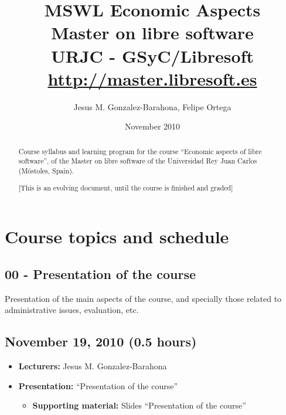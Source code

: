 \documentclass[a4paper]{article}
\title{MSWL Economic Aspects \\
Master on libre software \\
URJC - GSyC/Libresoft \\
\url{http://master.libresoft.es}}
\author{Jesus M. Gonzalez-Barahona, Felipe Ortega}
\date{November 2010}
\begin{document}
\maketitle

\begin{abstract}
Course syllabus and learning program for the course ``Economic aspects of libre software'', of the Master on libre software of the Universidad Rey Juan Carlos (Móstoles, Spain).

[This is an evolving document, until the course is finished and graded]
\end{abstract}

\tableofcontents

\section{Course topics and schedule}

\subsection{00 - Presentation of the course}

Presentation of the main aspects of the course, and specially those related to administrative issues, evaluation, etc.

\subsection{November 19, 2010 (0.5 hours)}

\begin{itemize}
\item \textbf{Lecturers:} Jesus M. Gonzalez-Barahona
\item \textbf{Presentation:} ``Presentation of the course''
  \begin{itemize}
  \item \textbf{Supporting material:} Slides ``Presentation of the course''
  \end{itemize}
\end{itemize}

\end{document}
